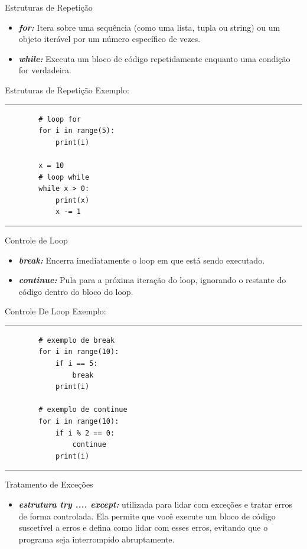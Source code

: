 \documentclass{beamer}
\begin{document}
\begin{frame}[fragile]{Estruturas de Repetição}

	\begin{itemize}
		\item  \textbf{\textit{for:}} Itera sobre uma sequência (como uma lista, tupla ou string) ou um objeto iterável por um número específico de vezes.
		\item \textbf{\textit{while:}} Executa um bloco de código repetidamente enquanto uma condição for verdadeira.
	\end{itemize}
\end{frame}

\begin{frame}[fragile]{Estruturas de Repetição}
	Exemplo:
	\rule{\textwidth}{1pt}
	\scriptsize	
	\begin{verbatim}
		# loop for
		for i in range(5):
			print(i)
		
		x = 10
		# loop while
		while x > 0:
			print(x)
			x -= 1
	\end{verbatim}
	\rule{\textwidth}{1pt}
	
\end{frame}


\begin{frame}[fragile]{Controle de Loop}
	\begin{itemize}
		\item  \textbf{\textit{break:}} Encerra imediatamente o loop em que está sendo executado.
		\item \textbf{\textit{continue:}} Pula para a próxima iteração do loop, ignorando o restante do código dentro do bloco do loop.
	\end{itemize}
\end{frame}

\begin{frame}[fragile]{Controle De Loop}
	Exemplo:
	\rule{\textwidth}{1pt}
	\scriptsize
	\begin{verbatim}
		# exemplo de break
		for i in range(10):
			if i == 5:
				break
			print(i)
		
		# exemplo de continue
		for i in range(10):
			if i % 2 == 0:
				continue
			print(i)

	\end{verbatim}
	\rule{\textwidth}{1pt}
	
\end{frame}

\begin{frame}[fragile]{Tratamento de Exceções}
	\begin{itemize}
		\item  \textbf{\textit{estrutura try .... except:}} utilizada para lidar com exceções e tratar erros de forma controlada. Ela permite que você execute um bloco de código suscetível a erros e defina como lidar com esses erros, evitando que o programa seja interrompido abruptamente. 
	\end{itemize}
\end{frame}
\end{document}

